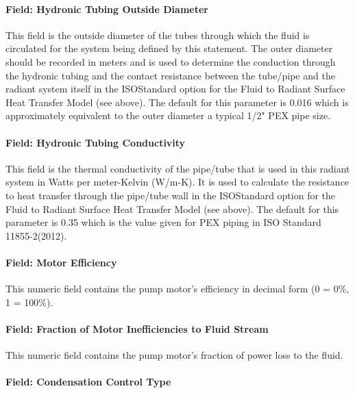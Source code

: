 \paragraph{Field: Hydronic Tubing Outside Diameter}\label{field-hydronic-tubing-outside-diameter-001}

This field is the outside diameter of the tubes through which the fluid is circulated for the system being defined by this statement. The outer diameter should be recorded in meters and is used to determine the conduction through the hydronic tubing and the contact resistance between the tube/pipe and the radiant system itself in the ISOStandard option for the Fluid to Radiant Surface Heat Transfer Model (see above).  The default for this parameter is 0.016 which is approximately equivalent to the outer diameter a typical 1/2" PEX pipe size.

\paragraph{Field: Hydronic Tubing Conductivity}\label{field-hydronic-tubing-conductivity-001}

This field is the thermal conductivity of the pipe/tube that is used in this radiant system in Watts per meter-Kelvin (W/m-K).  It is used to calculate the resistance to heat transfer through the pipe/tube wall in the ISOStandard option for the Fluid to Radiant Surface Heat Transfer Model (see above).  The default for this parameter is 0.35 which is the value given for PEX piping in ISO Standard 11855-2(2012).

\paragraph{Field: Motor Efficiency}\label{field-motor-efficiency-001}

This numeric field contains the pump motor's efficiency in decimal form (0 = 0\%, 1 = 100\%).

\paragraph{Field: Fraction of Motor Inefficiencies to Fluid Stream}\label{field-fraction-of-motor-inefficiencies-to-fluid-stream-000}

This numeric field contains the pump motor's fraction of power loss to the fluid.

\paragraph{Field: Condensation Control Type}\label{field-condensation-control-type-1}

